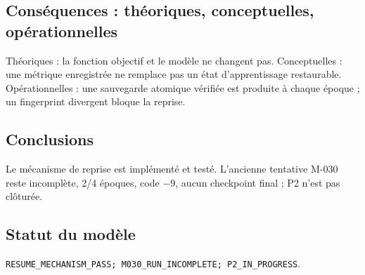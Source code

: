 \documentclass[11pt,a4paper]{report}
\begin{document}
\subsection{Conséquences : théoriques, conceptuelles, opérationnelles}
Théoriques : la fonction objectif et le modèle ne changent pas. Conceptuelles : une métrique enregistrée ne remplace pas un état d’apprentissage restaurable. Opérationnelles : une sauvegarde atomique vérifiée est produite à chaque époque ; un fingerprint divergent bloque la reprise.
\subsection{Conclusions}
Le mécanisme de reprise est implémenté et testé. L’ancienne tentative M-030 reste incomplète, 2/4 époques, code $-9$, aucun checkpoint final ; P2 n’est pas clôturée.
\subsection{Statut du modèle}
\texttt{RESUME\_MECHANISM\_PASS; M030\_RUN\_INCOMPLETE; P2\_IN\_PROGRESS}.
\end{document}

